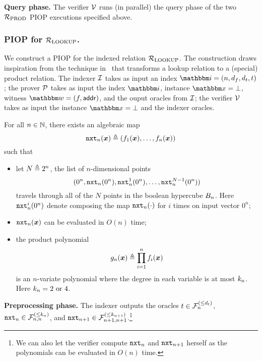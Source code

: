 \textbf{Query phase.}
The verifier $\mathcal{V}$ runs (in parallel) the query phase of the two ${\mathcal{R}}_{\text{PROD}}$ PIOP 
executions specified above.

\subsubsection*{PIOP for ${\mathcal{R}}_{\text{LOOKUP}}$.} 
We construct a PIOP for the indexed relation ${\mathcal{R}}_{\text{LOOKUP}}$.
The construction draws inspiration from the technique in~\cite{GW20} that 
transforms a lookup relation to a (special) product relation.
The indexer $\mathcal{I}$ takes as input an index $\idxR = (n, d_f, d_t, t)$;
the prover $\mathcal{P}$ takes as input the index $\idxR$, instance $\instR = \bot$,
witness $\witR = (f, \addr)$, and the ouput oracles from $\mathcal{I}$;
the verifier $\mathcal{V}$ takes as input the instance $\instR = \bot$ and 
the indexer oracles.

\begin{lemma}
    For all $n \in \mathbb{N}$, there exists an algebraic map
    \[
      \mathtt{nxt}_{n}(\boldsymbol{x}) \mathrel{\triangleq} (f_{1}(\boldsymbol{x}), \dots, f_{n}(\boldsymbol{x}))  
    \] such that 
    \begin{itemize}
        \item let $N \mathrel{\triangleq} 2^n$, the list of $n$-dimensional points
            \[
              (0^n, \mathtt{nxt}_{n}(0^n), \mathtt{nxt}_{n}^{1}(0^n), \dots, \mathtt{nxt}_{n}^{N-1}(0^n))
            \]
            travels through all of the $N$ points in the boolean hypercube $B_{n}$.
            Here $\mathtt{nxt}_{n}^{i}(0^n)$ denote composing the map $\mathtt{nxt}_{n}(\cdot)$ for $i$ times
            on input vector $0^n$;
        \item $\mathtt{nxt}_{n}(\boldsymbol{x})$ can be evaluated in $O(n)$ time;
        \item the product polynomial
            \[
                g_n(\boldsymbol{x}) \mathrel{\triangleq} \prod_{i=1}^{n} f_{i}(\boldsymbol{x})
            \] is an $n$-variate polynomial where the degree in each variable is at most $k_{n}$.
            Here $k_{n} = 2 \text{ or } 4$.
    \end{itemize}
\end{lemma}

\textbf{Preprocessing phase.}
The indexer outputs the oracles $t \in {\mathcal{F}}_{n}^{(\le{d_t})}$, $\mathtt{nxt}_{n} \in {\mathcal{F}}_{n,n}^{(\le{k_{n}})}$,
and $\mathtt{nxt}_{n+1} \in {\mathcal{F}}_{n+1,n+1}^{(\le{k_{n+1}})}$.\footnote{We can also let the verifier 
compute $\mathtt{nxt}_{n}$ and $\mathtt{nxt}_{n+1}$ herself as the polynomials can be evaluated in $O(n)$ time.}

